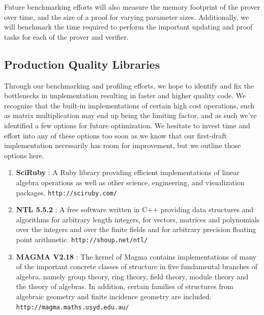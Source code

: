 \documentclass[11pt, letterpaper, oneside]{article}
\begin{document}
	Future benchmarking efforts will also measure the memory footprint of the prover over time, and the size of a proof for varying parameter sizes. Additionally, we will benchmark the time required to perform the important updating and proof tasks for each of the prover and verifier.


	\subsection{ Production Quality Libraries }

	Through our benchmarking and profiling efforts, we hope to identify and fix the bottlenecks in implementation resulting in faster and higher quality code.
	We recognize that the built-in implementations of certain high cost operations, such as matrix multiplication may end up being the limiting factor, and as such we've identified a few options for future optimization.
	We hesitate to invest time and effort into any of these options too soon as we know that our first-draft implementation necessarily has room for improvement, but we outline those options here.

	\begin{enumerate}
	\item \textbf{SciRuby} : A Ruby library providing efficient implementations of linear algebra operations as well as other science, engineering, and visualization packages. \texttt{http://sciruby.com/}
	\item \textbf{NTL 5.5.2} : A free software written in C++ providing data structures and algorithms for arbitrary length integers, for vectors, matrices and polynomials over the integers and over the finite fields and for arbitrary precision floating point arithmetic. \texttt{http://shoup.net/ntl/}
	\item \textbf{MAGMA V2.18} : The kernel of Magma contains implementations of many of the important concrete classes of structure in five fundamental branches of algebra, namely group theory, ring theory, field theory, module theory and the theory of algebras.
	In addition, certain families of structures from algebraic geometry and finite incidence geometry are included. \texttt{http://magma.maths.usyd.edu.au/}
	\end{enumerate}


\end{document}
